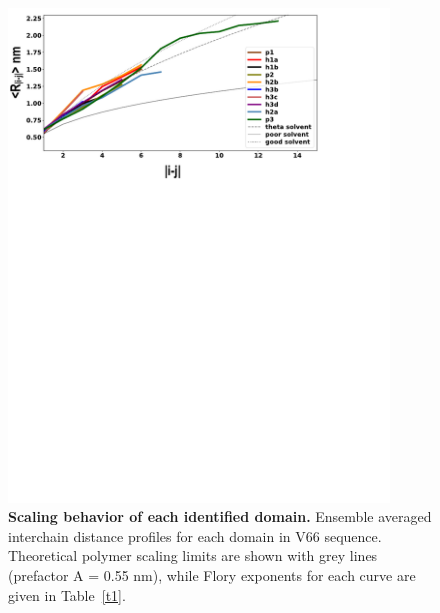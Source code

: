 \documentclass[journal=jacsat,manuscript=article]{achemso}
\begin{document}
\begin{figure}[!ht]
\includegraphics[scale=0.5,width=0.9\textwidth,trim={0 0cm 0 0cm},clip]{../figures/S3.pdf}
\caption{{\bf Scaling behavior of each identified domain.} Ensemble averaged interchain distance profiles for each domain in V66 sequence. Theoretical polymer scaling limits are shown with grey lines (prefactor A = 0.55 nm), while Flory exponents for each curve are given in Table~\ref{t1}. }
\label{S3} 
\end{figure}
\end{document}
